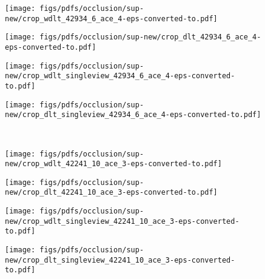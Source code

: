 \documentclass[runningheads]{llncs}
\begin{document}
\begin{figure*}
	
	\begin{subfigure}[b]{0.23\linewidth}        \centering
		\texttt{[image: figs/pdfs/occlusion/sup-new/crop\_wdlt\_42934\_6\_ace\_4-eps-converted-to.pdf]}
	\end{subfigure}
	\begin{subfigure}[b]{0.23\linewidth}        \centering
		\texttt{[image: figs/pdfs/occlusion/sup-new/crop\_dlt\_42934\_6\_ace\_4-eps-converted-to.pdf]}
	\end{subfigure}
	\begin{subfigure}[b]{0.23\linewidth}        \centering
		\texttt{[image: figs/pdfs/occlusion/sup-new/crop\_wdlt\_singleview\_42934\_6\_ace\_4-eps-converted-to.pdf]}
	\end{subfigure}
	\begin{subfigure}[b]{0.23\linewidth}        \centering
		\texttt{[image: figs/pdfs/occlusion/sup-new/crop\_dlt\_singleview\_42934\_6\_ace\_4-eps-converted-to.pdf]}
	\end{subfigure} \\ \vspace{1mm}
	
	
	\begin{subfigure}[b]{0.23\linewidth}        \centering
		\texttt{[image: figs/pdfs/occlusion/sup-new/crop\_wdlt\_42241\_10\_ace\_3-eps-converted-to.pdf]}
	\end{subfigure}
	\begin{subfigure}[b]{0.23\linewidth}        \centering
		\texttt{[image: figs/pdfs/occlusion/sup-new/crop\_dlt\_42241\_10\_ace\_3-eps-converted-to.pdf]}
	\end{subfigure}
	\begin{subfigure}[b]{0.23\linewidth}        \centering
		\texttt{[image: figs/pdfs/occlusion/sup-new/crop\_wdlt\_singleview\_42241\_10\_ace\_3-eps-converted-to.pdf]}
	\end{subfigure}
	\begin{subfigure}[b]{0.23\linewidth}        \centering
		\texttt{[image: figs/pdfs/occlusion/sup-new/crop\_dlt\_singleview\_42241\_10\_ace\_3-eps-converted-to.pdf]}
	\end{subfigure} \\ \vspace{1mm}
	

\end{figure*}
\end{document}
